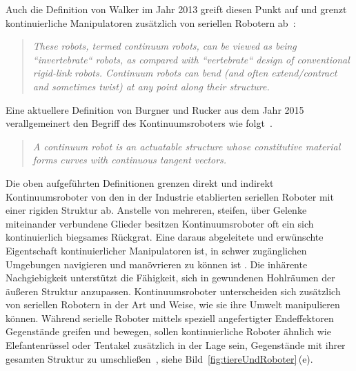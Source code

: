 Auch die Definition von Walker im Jahr 2013 greift diesen Punkt auf und grenzt kontinuierliche Manipulatoren zusätzlich von seriellen Robotern ab~\cite{Wal13}:

\begin{quotation}
\textit{These robots, termed continuum robots, can be viewed as being ``invertebrate`` robots, as compared with ``vertebrate`` design of conventional rigid-link robots. Continuum robots can bend (and often extend/contract and sometimes twist) at any point along their structure.}
\end{quotation}


Eine aktuellere Definition von Burgner und Rucker aus dem Jahr 2015 verallgemeinert den Begriff des Kontinuumsroboters wie folgt~\cite{BRC15}. 

\begin{quotation}
\textit{A continuum robot is an actuatable structure whose constitutive material forms curves with continuous tangent vectors.}
\end{quotation}

Die oben aufgeführten Definitionen grenzen direkt und indirekt Kontinuumsroboter von den in der Industrie etablierten seriellen Roboter mit einer rigiden Struktur ab. Anstelle von mehreren, steifen, über Gelenke miteinander verbundene Glieder besitzen Kontinuumsroboter oft ein sich kontinuierlich biegsames Rückgrat. Eine daraus abgeleitete und erwünschte Eigentschaft kontinuierlicher Manipulatoren ist, in schwer zugänglichen Umgebungen navigieren und manövrieren zu können ist . Die inhärente Nachgiebigkeit unterstützt die Fähigkeit, sich in gewundenen Hohlräumen der äußeren Struktur anzupassen. Kontinuumsroboter unterscheiden sich zusätzlich von seriellen Robotern in der Art und Weise, wie sie ihre Umwelt manipulieren können. Während serielle Roboter mittels speziell angefertigter Endeffektoren Gegenstände greifen und bewegen, sollen kontinuierliche Roboter ähnlich wie Elefantenrüssel oder Tentakel zusätzlich in der Lage sein, Gegenstände mit ihrer gesamten Struktur zu umschließen~\cite{Moc01}, siehe Bild~\ref{fig:tiereUndRoboter}\,(e).

